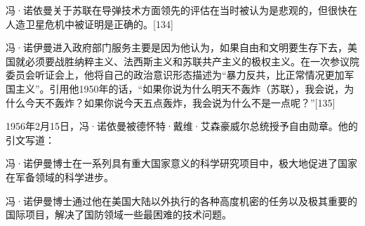 冯·诺依曼关于苏联在导弹技术方面领先的评估在当时被认为是悲观的，但很快在人造卫星危机中被证明是正确的。[134]

冯·诺伊曼进入政府部门服务主要是因为他认为，如果自由和文明要生存下去，美国就必须要战胜纳粹主义、法西斯主义和苏联共产主义的极权主义。在一次参议院委员会听证会上，他将自己的政治意识形态描述为“暴力反共，比正常情况更加军国主义”。引用他1950年的话，“如果你说为什么明天不轰炸（苏联），我会说，为什么今天不轰炸？如果你说今天五点轰炸，我会说为什么不是一点呢？”[135]

1956年2月15日，冯·诺依曼被德怀特·戴维·艾森豪威尔总统授予自由勋章。他的引文写道：

冯·诺伊曼博士在一系列具有重大国家意义的科学研究项目中，极大地促进了国家在军备领域的科学进步。

冯·诺伊曼博士通过他在美国大陆以外执行的各种高度机密的任务以及极其重要的国际项目，解决了国防领域一些最困难的技术问题。